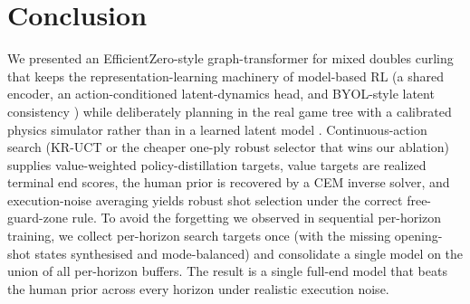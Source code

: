 \documentclass[11pt]{article}
\begin{document}
\section{Conclusion}
We presented an EfficientZero-style graph-transformer for mixed doubles
curling that keeps the representation-learning machinery of model-based RL
(a shared encoder, an action-conditioned latent-dynamics head, and
BYOL-style latent consistency \cite{grill2020bootstrap,ye2021mastering})
while deliberately planning in the real game tree with a calibrated physics
simulator rather than in a learned latent model
\cite{schrittwieser2020mastering}. Continuous-action search (KR-UCT
\cite{yee2016monte} or the cheaper one-ply robust selector that wins our
ablation) supplies value-weighted policy-distillation targets, value targets
are realized terminal end scores, the human prior is recovered by a CEM
\cite{deboer2005tutorial} inverse solver, and execution-noise averaging
\cite{yee2016monte} yields robust shot selection under the correct
free-guard-zone rule. To avoid the forgetting we observed in sequential
per-horizon training, we collect per-horizon search targets once (with the
missing opening-shot states synthesised and mode-balanced) and consolidate
a single model on the union of all per-horizon buffers. The result is a
single full-end model that beats the human prior across every horizon under
realistic execution noise.

\appendix
\end{document}
